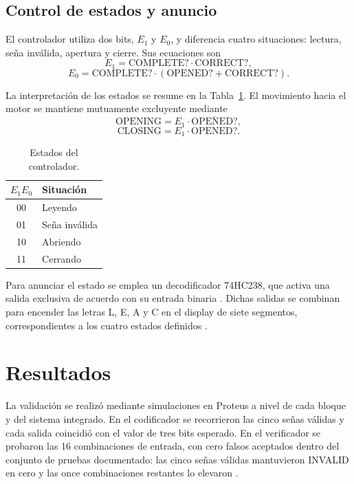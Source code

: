 \documentclass[10pt,journal]{IEEEtran}
\begin{document}
\subsection{Control de estados y anuncio}
El controlador utiliza dos bits, $E_1$ y $E_0$, y diferencia cuatro situaciones: lectura, seña inválida, apertura y cierre. Sus ecuaciones son
\begin{equation}
E_1=\mathrm{COMPLETE?}\cdot\mathrm{CORRECT?},
\end{equation}
\begin{equation}
E_0=\mathrm{COMPLETE?}\cdot(\mathrm{OPENED?}+\mathrm{CORRECT?}).
\end{equation}

La interpretación de los estados se resume en la Tabla~\ref{tab:states}. El movimiento hacia el motor se mantiene mutuamente excluyente mediante
\begin{equation}
\mathrm{OPENING}=E_1\cdot\overline{\mathrm{OPENED?}},
\end{equation}
\begin{equation}
\mathrm{CLOSING}=E_1\cdot\mathrm{OPENED?}.
\end{equation}

\begin{table}[t]
\caption{Estados del controlador.}
\label{tab:states}
\centering
\small
\begin{tabular}{c l}
\toprule
$E_1E_0$ & Situación \\
\midrule
00 & Leyendo \\
01 & Seña inválida \\
10 & Abriendo \\
11 & Cerrando \\
\bottomrule
\end{tabular}
\end{table}

Para anunciar el estado se emplea un decodificador 74HC238, que activa una salida exclusiva de acuerdo con su entrada binaria \cite{hc238}. Dichas salidas se combinan para encender las letras L, E, A y C en el display de siete segmentos, correspondientes a los cuatro estados definidos \cite{bitacora}.

\section{Resultados}
La validación se realizó mediante simulaciones en Proteus a nivel de cada bloque y del sistema integrado. En el codificador se recorrieron las cinco señas válidas y cada salida coincidió con el valor de tres bits esperado. En el verificador se probaron las 16 combinaciones de entrada, con cero falsos aceptados dentro del conjunto de pruebas documentado: las cinco señas válidas mantuvieron INVALID en cero y las once combinaciones restantes lo elevaron \cite{bitacora}.
\end{document}
